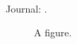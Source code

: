 \documentclass{article}
\begin{document}
Journal: \apj.
\begin{figure}[h]
\caption{A figure.}
\end{figure}
\end{document}
